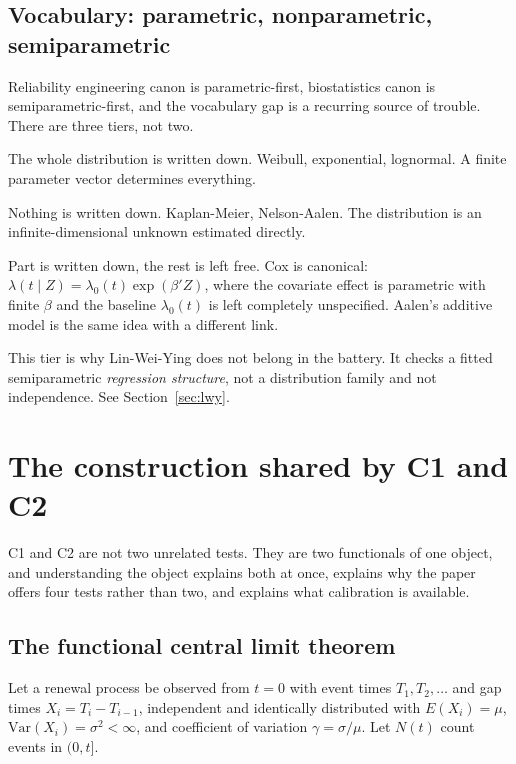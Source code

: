\documentclass[11pt,a4paper]{article}
\begin{document}
\subsection{Vocabulary: parametric, nonparametric, semiparametric}
\label{sec:semiparametric}

Reliability engineering canon is parametric-first, biostatistics canon is
semiparametric-first, and the vocabulary gap is a recurring source of trouble. There are
three tiers, not two.

\begin{description}[leftmargin=1.6em,itemsep=2pt]
\item[Parametric.] The whole distribution is written down. Weibull, exponential,
lognormal. A finite parameter vector determines everything.
\item[Nonparametric.] Nothing is written down. Kaplan-Meier, Nelson-Aalen. The
distribution is an infinite-dimensional unknown estimated directly.
\item[Semiparametric.] Part is written down, the rest is left free. Cox is canonical:
$\lambda(t \mid Z) = \lambda_0(t)\exp(\beta' Z)$, where the covariate effect is
parametric with finite $\beta$ and the baseline $\lambda_0(t)$ is left completely
unspecified. Aalen's additive model is the same idea with a different link.
\end{description}

This tier is why Lin-Wei-Ying does not belong in the battery. It checks a fitted
semiparametric \emph{regression structure}, not a distribution family and not
independence. See Section~\ref{sec:lwy}.

\section{The construction shared by C1 and C2}

C1 and C2 are not two unrelated tests. They are two functionals of one object, and
understanding the object explains both at once, explains why the paper offers four
tests rather than two, and explains what calibration is available.

\subsection{The functional central limit theorem}

Let a renewal process be observed from $t = 0$ with event times $T_1, T_2, \dots$ and
gap times $X_i = T_i - T_{i-1}$, independent and identically distributed with
$E(X_i) = \mu$, $\mathrm{Var}(X_i) = \sigma^2 < \infty$, and coefficient of variation
$\gamma = \sigma/\mu$. Let $N(t)$ count events in $(0,t]$.
\end{document}
